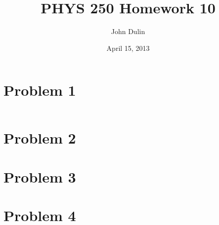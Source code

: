\documentclass[12pt,a4paper,notitlepage]{article}
\title{PHYS 250 Homework 10}
\author{John Dulin}
\date{April 15, 2013}
\begin{document}
\maketitle

\section*{Problem 1}
\begin{verbatim}

\end{verbatim}

\section*{Problem 2}
\section*{Problem 3}
\section*{Problem 4}
\end{document}
